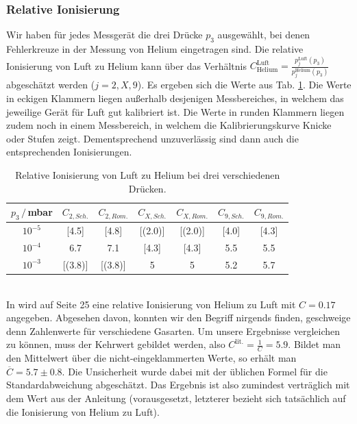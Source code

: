 \documentclass[german, parskip=full]{scrartcl}
\newcommand{\tecxt}{}
\begin{document}
\subsubsection{Relative Ionisierung}
Wir haben für jedes Messgerät die drei Drücke $p_3$ ausgewählt, bei denen Fehlerkreuze in der Messung von Helium eingetragen sind. Die relative Ionisierung von Luft zu Helium kann über das Verhältnis $C^\tecxt\text{Luft}_\tecxt\text{Helium}=\frac{p_j^\tecxt\text{Luft}(p_3)}{p_j^\tecxt\text{Helium}(p_3)}$ abgeschätzt werden ($j=2,X,9$). Es ergeben sich die Werte aus Tab. \ref{table:relative Ionisierung}. Die Werte in eckigen Klammern liegen außerhalb desjenigen Messbereiches, in welchem das jeweilige Gerät für Luft gut kalibriert ist. Die Werte in runden Klammern liegen zudem noch in einem Messbereich, in welchem die Kalibrierungskurve Knicke oder Stufen zeigt. Dementsprechend unzuverlässig sind dann auch die entsprechenden Ionisierungen.
\begin{table}[h!]
\centering
\begin{tabular}{c||c|c||c|c||c|c}
$p_3\,/\,$mbar&$C_{2,Sch.}$&$C_{2,Rom.}$&$C_{X,Sch.}$&$C_{X,Rom.}$&$C_{9,Sch.}$&$C_{9,Rom.}$\\ \hline
$10^{-5}$&[4.5]&[4.8]&[(2.0)]&[(2.0)]&[4.0]&[4.3]\\ \hline
$10^{-4}$&6.7&7.1&[4.3]&[4.3]&5.5&5.5\\ \hline
$10^{-3}$&[(3.8)]&[(3.8)]&5&5&5.2&5.7\\
\end{tabular}
\caption{Relative Ionisierung von Luft zu Helium bei drei verschiedenen Drücken.}
\label{table:relative Ionisierung}
\end{table}\\
In \cite{VAK Anleitung} wird auf Seite 25 eine relative Ionisierung von Helium zu Luft mit $C=0.17$ angegeben. Abgesehen davon, konnten wir den Begriff nirgends finden, geschweige denn Zahlenwerte für verschiedene Gasarten. Um unsere Ergebnisse vergleichen zu können, muss der Kehrwert gebildet werden, also $C^\tecxt\text{lit.}=\frac{1}{C}=5.9$. Bildet man den Mittelwert über die nicht-eingeklammerten Werte, so erhält man $\overline{C}=5.7\pm 0.8$. Die Unsicherheit wurde dabei mit der üblichen Formel für die Standardabweichung abgeschätzt. Das Ergebnis ist also zumindest verträglich mit dem Wert aus der Anleitung (vorausgesetzt, letzterer bezieht sich tatsächlich auf die Ionisierung von Helium zu Luft).
\end{document}
